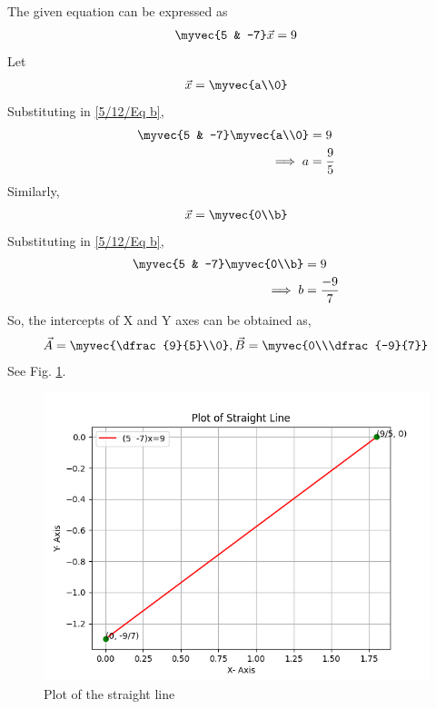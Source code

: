 %
The given equation can be expressed as 
\begin{align} \label{5/12/Eq b}
\myvec{5 & -7}\vec{x} =9 
\end{align}
Let 
\begin{align}
\vec{x}=\myvec{a\\0}
\end{align}
Substituting in  \eqref{5/12/Eq b},
\begin{align}
\myvec{5 & -7} \myvec{a\\0} &= 9
\\
\implies a & = \frac{9}{5}
\end{align}
Similarly,
\begin{align}
\vec{x}=\myvec{0\\b}
\end{align}
Substituting in  \eqref{5/12/Eq b},
\begin{align}
\myvec{5 & -7} \myvec{0\\b} &= 9
\\ \implies b &= \frac{-9}{7}
\end{align}
So, the intercepts of X and Y axes can be obtained as,
\begin{align}
\vec{A}=\myvec{\dfrac{9}{5}\\0} , 
\vec{B}=\myvec{0\\\dfrac{-9}{7}}
\end{align}
%
See Fig. \ref{5/12/fig}.
%
\begin{figure}[!ht]
\includegraphics[width=\columnwidth]{Figure_1.png}
\caption{ Plot of the straight line }
\label{5/12/fig}
\end{figure}












